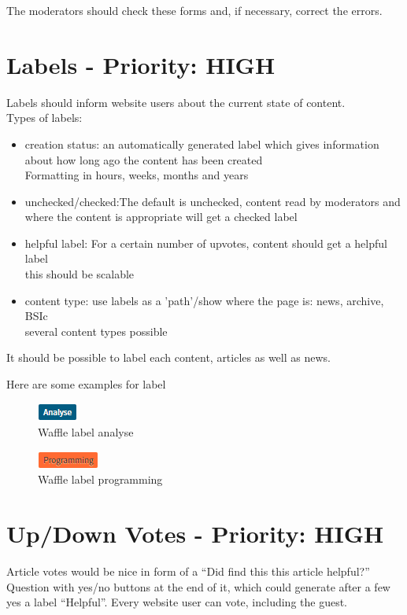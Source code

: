 The moderators should check these forms and, if necessary, correct the errors.


\section{Labels - Priority: HIGH}
 
\begin{tcolorbox}[breakable,colback=red!14,colframe=red!40!black,title=UPDATE 30/11/2017]
Labels should inform website users about the current state of content. 
\\
Types of labels:
\begin{itemize}
    \item creation status: an automatically generated label which gives information about how long ago the content has been created\\
Formatting in hours, weeks, months and years
    \item unchecked/checked:The default is unchecked, content read by moderators and where the content is appropriate will get a checked label
    \item helpful label: For a certain number of upvotes, content should get a helpful label\\
this should be scalable
    \item content type: use labels as a 'path'/show where the page is: news, archive, BSIc\\
several content types possible
\end{itemize}

It should be possible to label each content, articles as well as news.


\end{tcolorbox}

Here are some examples for label
\begin{figure}[h] 
    \centering
    \includegraphics[scale=1.0]{Pictures/label1}
    \caption{Waffle label analyse}
\end{figure} 
\begin{figure}[h] 
    \centering
    \includegraphics[scale=1.0]{Pictures/label2}
    \caption{Waffle label programming}
\end{figure}

\section{Up/Down Votes - Priority: HIGH}
\begin{tcolorbox}[breakable,colback=red!14,colframe=red!40!black,title=UPDATE 30/11/2017]
Article votes would be nice in form of a “Did find this this article helpful?” Question with yes/no buttons at the end of it, which could generate after a few yes a label “Helpful”.
Every website user can vote, including the guest.
\end{tcolorbox}

